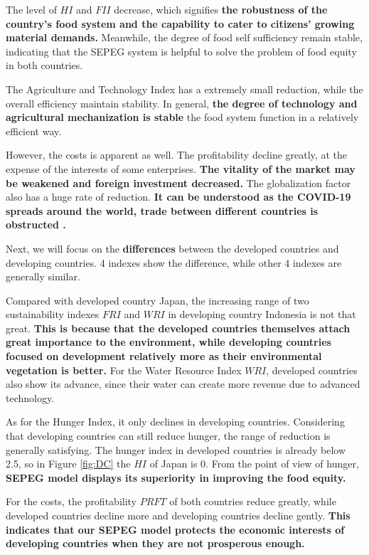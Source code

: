 \documentclass{mcmthesis}
\begin{document}
The level of $HI$ and $FII$ decrease, which signifies \textbf{the robustness of the country's food system and the capability to cater to citizens' growing material demands.} Meanwhile, the degree of food self sufficiency remain stable, indicating that the SEPEG system is helpful to solve the problem of food equity in both countries. 
 
The Agriculture and Technology Index has a extremely small reduction, while the overall efficiency maintain stability. In general, \textbf{the degree of technology and agricultural mechanization is stable} the food system function in a relatively efficient way.
 
However, the costs is apparent as well. The profitability decline greatly, at the expense of the interests of some enterprises. \textbf{The vitality of the market may be weakened and foreign investment decreased. }The globalization factor also has a huge rate of reduction. \textbf{It can be understood as the COVID-19 spreads around the world, trade between different countries is obstructed \cite{covid-19}. }
 
 Next, we will focus on the \textbf{differences} between the developed countries and developing countries. 4 indexes show the difference, while other 4 indexes are generally similar. 
 
 Compared with developed country Japan, the increasing range of two sustainability indexes $FRI$ and $WRI$ in developing country Indonesia is not that great. \textbf{This is because that the developed countries themselves attach great importance to the environment, while  developing countries focused on development relatively more as their environmental vegetation is better.} For the Water Resource Index $WRI$, developed countries also show its advance, since their water can create more revenue due to advanced technology.
 
As for the Hunger Index, it only declines in developing countries. Considering that developing countries can still reduce hunger, the range of reduction is generally satisfying. The hunger index in developed countries is already below 2.5, so in Figure \ref{fig:DC} the $HI$ of Japan is 0. From the point of view of hunger, \textbf{SEPEG model displays its superiority in improving the food equity.}

For the costs, the profitability $PRFT$ of both countries reduce greatly, while developed countries decline more and developing countries decline gently.\textbf{ This indicates that our SEPEG model protects the economic interests of developing countries when they are not prosperous enough.}
\end{document}
